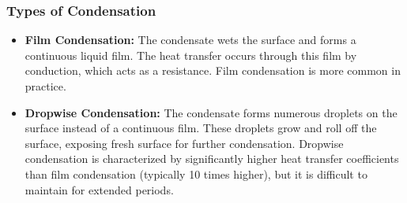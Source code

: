 \subsubsection*{Types of Condensation}
\begin{itemize}
    \item \textbf{Film Condensation:} The condensate wets the surface and forms a continuous liquid film. The heat transfer occurs through this film by conduction, which acts as a resistance. Film condensation is more common in practice.
    \item \textbf{Dropwise Condensation:} The condensate forms numerous droplets on the surface instead of a continuous film. These droplets grow and roll off the surface, exposing fresh surface for further condensation. Dropwise condensation is characterized by significantly higher heat transfer coefficients than film condensation (typically 10 times higher), but it is difficult to maintain for extended periods.
\end{itemize}

